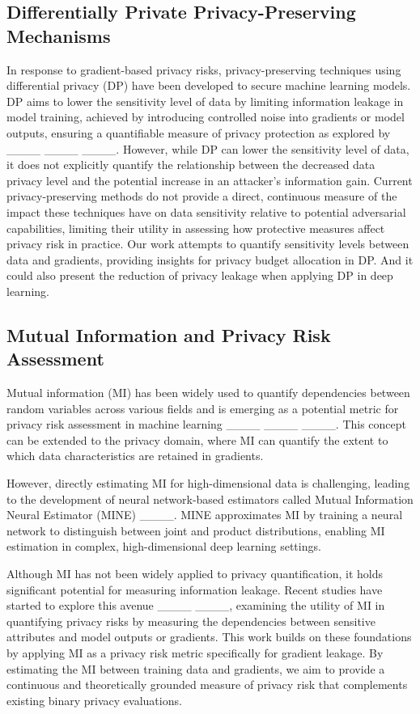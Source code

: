 \subsection{Differentially Private Privacy-Preserving Mechanisms}

In response to gradient-based privacy risks, privacy-preserving techniques using differential privacy (DP) have been developed to secure machine learning models. DP aims to lower the sensitivity level of data by limiting information leakage in model training, achieved by introducing controlled noise into gradients or model outputs, ensuring a quantifiable measure of privacy protection as explored by ____ ____ ____. However, while DP can lower the sensitivity level of data, it does not explicitly quantify the relationship between the decreased data privacy level and the potential increase in an attacker’s information gain. Current privacy-preserving methods do not provide a direct, continuous measure of the impact these techniques have on data sensitivity relative to potential adversarial capabilities, limiting their utility in assessing how protective measures affect privacy risk in practice. Our work attempts to quantify sensitivity levels between data and gradients, providing insights for privacy budget allocation in DP. And it could also present the reduction of privacy leakage when applying DP in deep learning.

\subsection{Mutual Information and Privacy Risk Assessment}

Mutual information (MI) has been widely used to quantify dependencies between random variables across various fields and is emerging as a potential metric for privacy risk assessment in machine learning ____ ____ ____. This concept can be extended to the privacy domain, where MI can quantify the extent to which data characteristics are retained in gradients.

However, directly estimating MI for high-dimensional data is challenging, leading to the development of neural network-based estimators called Mutual Information Neural Estimator (MINE) ____. MINE approximates MI by training a neural network to distinguish between joint and product distributions, enabling MI estimation in complex, high-dimensional deep learning settings. 

Although MI has not been widely applied to privacy quantification, it holds significant potential for measuring information leakage. Recent studies have started to explore this avenue ____ ____, examining the utility of MI in quantifying privacy risks by measuring the dependencies between sensitive attributes and model outputs or gradients. This work builds on these foundations by applying MI as a privacy risk metric specifically for gradient leakage. By estimating the MI between training data and gradients, we aim to provide a continuous and theoretically grounded measure of privacy risk that complements existing binary privacy evaluations.

